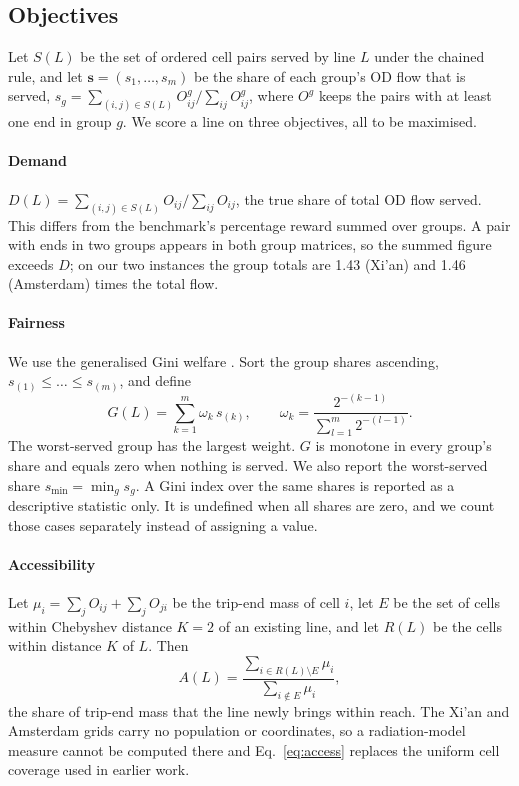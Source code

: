 \subsection{Objectives}\label{sec:objectives}
Let $S(L)$ be the set of ordered cell pairs served by line $L$ under the chained rule, and let $\mathbf{s}=(s_1,\dots,s_m)$ be the share of each group's OD flow that is served, $s_g=\sum_{(i,j)\in S(L)}O^{g}_{ij}/\sum_{ij}O^{g}_{ij}$, where $O^{g}$ keeps the pairs with at least one end in group $g$. We score a line on three objectives, all to be maximised.

\paragraph{Demand} $D(L)=\sum_{(i,j)\in S(L)}O_{ij}\big/\sum_{ij}O_{ij}$, the true share of total OD flow served. This differs from the benchmark's percentage reward summed over groups. A pair with ends in two groups appears in both group matrices, so the summed figure exceeds $D$; on our two instances the group totals are 1.43 (Xi'an) and 1.46 (Amsterdam) times the total flow.

\paragraph{Fairness} We use the generalised Gini welfare \citep{weymark1981}. Sort the group shares ascending, $s_{(1)}\le\dots\le s_{(m)}$, and define
\begin{equation}
G(L)=\sum_{k=1}^{m}\omega_k\,s_{(k)},\qquad \omega_k=\frac{2^{-(k-1)}}{\sum_{l=1}^{m}2^{-(l-1)}} .\label{eq:ggi}
\end{equation}
The worst-served group has the largest weight. $G$ is monotone in every group's share and equals zero when nothing is served. We also report the worst-served share $s_{\min}=\min_g s_g$. A Gini index over the same shares is reported as a descriptive statistic only. It is undefined when all shares are zero, and we count those cases separately instead of assigning a value.

\paragraph{Accessibility} Let $\mu_i=\sum_j O_{ij}+\sum_j O_{ji}$ be the trip-end mass of cell $i$, let $E$ be the set of cells within Chebyshev distance $K=2$ of an existing line, and let $R(L)$ be the cells within distance $K$ of $L$. Then
\begin{equation}
A(L)=\frac{\sum_{i\in R(L)\setminus E}\mu_i}{\sum_{i\notin E}\mu_i},\label{eq:access}
\end{equation}
the share of trip-end mass that the line newly brings within reach. The Xi'an and Amsterdam grids carry no population or coordinates, so a radiation-model measure \citep{simini2012} cannot be computed there and Eq.~\eqref{eq:access} replaces the uniform cell coverage used in earlier work.

